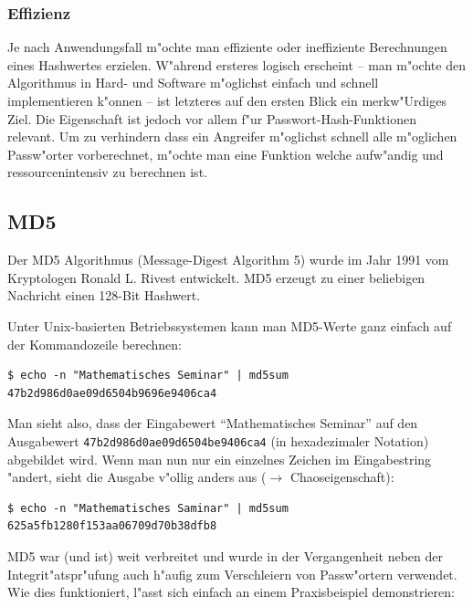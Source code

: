 \begin{refsection}
\subsubsection{Effizienz}

Je nach Anwendungsfall m"ochte man effiziente oder ineffiziente Berechnungen
eines Hashwertes erzielen. W"ahrend ersteres logisch erscheint -- man m"ochte
den Algorithmus in Hard- und Software m"oglichst einfach und schnell
implementieren k"onnen -- ist letzteres auf den ersten Blick ein merkw"Urdiges
Ziel. Die Eigenschaft ist jedoch vor allem f"ur Passwort-Hash-Funktionen
relevant. Um zu verhindern dass ein Angreifer m"oglichst schnell alle m"oglichen
Passw"orter vorberechnet, m"ochte man eine Funktion welche aufw"andig und
ressourcenintensiv zu berechnen ist.

\subsection{MD5}

Der MD5 Algorithmus (Message-Digest Algorithm 5) wurde im Jahr 1991 vom
Kryptologen Ronald L. Rivest entwickelt. MD5 erzeugt zu einer beliebigen
Nachricht einen 128-Bit Hashwert.

Unter Unix-basierten Betriebssystemen kann man MD5-Werte ganz einfach auf der
Kommandozeile berechnen:

\begin{verbatim}
$ echo -n "Mathematisches Seminar" | md5sum 
47b2d986d0ae09d6504b9696e9406ca4
\end{verbatim}

Man sieht also, dass der Eingabewert ``Mathematisches Seminar'' auf den
Ausgabewert \texttt{47b2\-d986\-d0ae\-09d6\-504b\-e940\-6ca4} (in
hexadezimaler Notation) abgebildet wird. Wenn man nun nur ein einzelnes
Zeichen im Eingabestring "andert, sieht die Ausgabe v"ollig anders aus
($\rightarrow$ Chaoseigenschaft):

\begin{verbatim}
$ echo -n "Mathematisches Saminar" | md5sum 
625a5fb1280f153aa06709d70b38dfb8
\end{verbatim}

MD5 war (und ist) weit verbreitet und wurde in der Vergangenheit neben der
Integrit"atspr"ufung auch h"aufig zum Verschleiern von Passw"ortern verwendet.
Wie dies funktioniert, l"asst sich einfach an einem Praxisbeispiel
demonstrieren:


\end{refsection}
